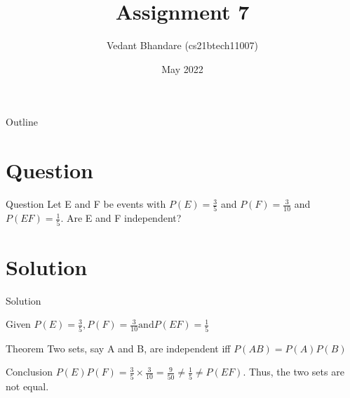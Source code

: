 \documentclass{beamer}
\title{Assignment 7}
\author{Vedant Bhandare (cs21btech11007)}
\date{May 2022}
\begin{document}
\begin{frame}
    \titlepage 
\end{frame}

\logo{}


\begin{frame}{Outline}
    \tableofcontents
\end{frame}

\section{Question}
\begin{frame}{Question}
Let E and F be events with $P(E) = \frac{3}{5}$ and $P(F) = \frac{3}{10}$ and $P(EF) = \frac{1}{5}$. Are E and F independent?

\end{frame}


\section{Solution}
\begin{frame}{Solution}
    \begin{block}{Given}
        $P(E) = \frac{3}{5},
        P(F) = \frac{3}{10} \text{and} 
        P(EF) = \frac{1}{5}$
    \end{block}
   \begin{exampleblock}{Theorem}
        Two sets, say A and B, are independent iff $P(AB) = P(A)P(B)$
   \end{exampleblock}
   \begin{block}{Conclusion}
        $P(E)P(F) = \frac{3}{5} \times \frac{3}{10} =   \frac{9}{50} \neq \frac{1}{5} \neq P(EF)$.
        Thus, the two sets are not equal.
    \end{block}
\end{frame} 
\end{document}

